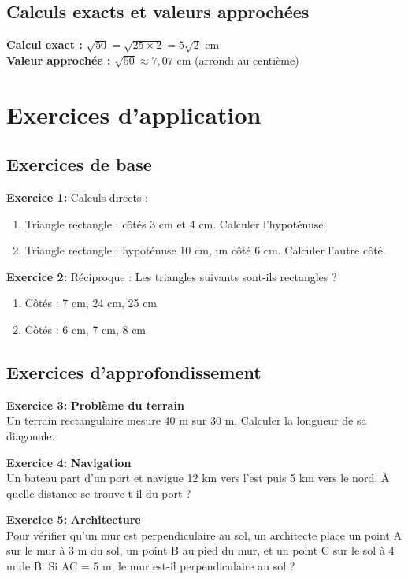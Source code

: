 \subsection{Calculs exacts et valeurs approchées}

\textbf{Calcul exact :} $\sqrt{50} = \sqrt{25 \times 2} = 5\sqrt{2}$ cm\\
\textbf{Valeur approchée :} $\sqrt{50} \approx 7,07$ cm (arrondi au centième)



\section{Exercices d'application}

\subsection{Exercices de base}

\begin{exercisebox}
\textbf{Exercice 1:} Calculs directs :
\begin{enumerate}[label=\alph*)]
    \item Triangle rectangle : côtés 3 cm et 4 cm. Calculer l'hypoténuse.
    \item Triangle rectangle : hypoténuse 10 cm, un côté 6 cm. Calculer l'autre côté.
\end{enumerate}

\textbf{Exercice 2:}
Réciproque : Les triangles suivants sont-ils rectangles ?
\begin{enumerate}[label=\alph*)]
	\item Côtés : 7 cm, 24 cm, 25 cm
	\item Côtés : 6 cm, 7 cm, 8 cm
\end{enumerate}
\end{exercisebox}

\subsection{Exercices d'approfondissement}

\begin{exercisebox}
\textbf{Exercice 3:}
\textbf{Problème du terrain}\\
Un terrain rectangulaire mesure 40 m sur 30 m. Calculer la longueur de sa diagonale.

\textbf{Exercice 4:}
\textbf{Navigation}\\
Un bateau part d'un port et navigue 12 km vers l'est puis 5 km vers le nord. À quelle distance se trouve-t-il du port ?

\textbf{Exercice 5:}
\textbf{Architecture}\\
Pour vérifier qu'un mur est perpendiculaire au sol, un architecte place un point A sur le mur à 3 m du sol, un point B au pied du mur, et un point C sur le sol à 4 m de B. Si AC = 5 m, le mur est-il perpendiculaire au sol ?
\end{exercisebox}

